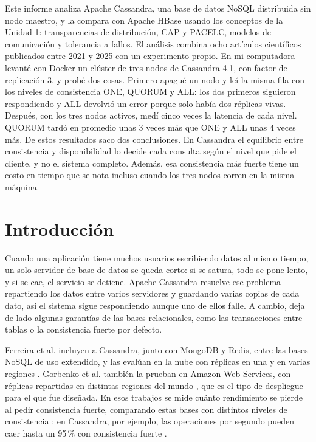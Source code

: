\documentclass[12pt,a4paper]{article}
\begin{document}
Este informe analiza Apache Cassandra, una base de datos NoSQL distribuida sin nodo maestro, y la compara con Apache HBase usando los conceptos de la Unidad 1: transparencias de distribución, CAP y PACELC, modelos de comunicación y tolerancia a fallos. El análisis combina ocho artículos científicos publicados entre 2021 y 2025 con un experimento propio. En mi computadora levanté con Docker un clúster de tres nodos de Cassandra 4.1, con factor de replicación 3, y probé dos cosas. Primero apagué un nodo y leí la misma fila con los niveles de consistencia ONE, QUORUM y ALL: los dos primeros siguieron respondiendo y ALL devolvió un error porque solo había dos réplicas vivas. Después, con los tres nodos activos, medí cinco veces la latencia de cada nivel. QUORUM tardó en promedio unas 3 veces más que ONE y ALL unas 4 veces más. De estos resultados saco dos conclusiones. En Cassandra el equilibrio entre consistencia y disponibilidad lo decide cada consulta según el nivel que pide el cliente, y no el sistema completo. Además, esa consistencia más fuerte tiene un costo en tiempo que se nota incluso cuando los tres nodos corren en la misma máquina.

\section{Introducción}
Cuando una aplicación tiene muchos usuarios escribiendo datos al mismo tiempo, un solo servidor de base de datos se queda corto: si se satura, todo se pone lento, y si se cae, el servicio se detiene. Apache Cassandra resuelve ese problema repartiendo los datos entre varios servidores y guardando varias copias de cada dato, así el sistema sigue respondiendo aunque uno de ellos falle. A cambio, deja de lado algunas garantías de las bases relacionales, como las transacciones entre tablas o la consistencia fuerte por defecto.

Ferreira et al. incluyen a Cassandra, junto con MongoDB y Redis, entre las bases NoSQL de uso extendido, y las evalúan en la nube con réplicas en una y en varias regiones \cite{ferreira2024impacts}. Gorbenko et al. también la prueban en Amazon Web Services, con réplicas repartidas en distintas regiones del mundo \cite{gorbenko2021performance}, que es el tipo de despliegue para el que fue diseñada. En esos trabajos se mide cuánto rendimiento se pierde al pedir consistencia fuerte, comparando estas bases con distintos niveles de consistencia \cite{ferreira2025experimental,ferreira2025benchmarking}; en Cassandra, por ejemplo, las operaciones por segundo pueden caer hasta un 95\,\% con consistencia fuerte \cite{ferreira2025benchmarking}.
\end{document}
